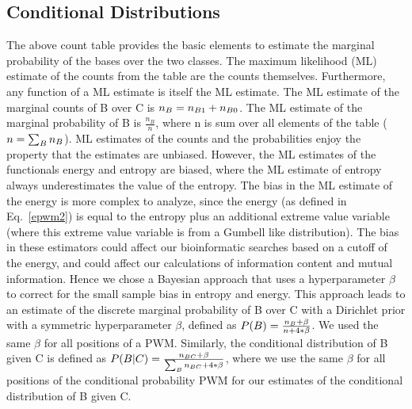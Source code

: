 \subsection{Conditional Distributions}\label{cdhyper}
The above count table provides the basic elements to estimate the marginal probability of the bases over the two classes.  The maximum likelihood (ML) estimate of the counts from the table are the counts themselves.  Furthermore, any function of a ML estimate is itself the ML estimate.  The ML estimate of the marginal counts of B over C is $n_{\scriptsize B}=n_{\scriptsize{B1}}+n_{
\scriptsize{B0}}$.  The ML estimate of the marginal probability of B is $\frac{n_B}{n}$, where n is sum over all elements of the table ($n=\sum_{\scriptsize B} n_{\scriptsize B}$).  ML estimates of the counts and the probabilities enjoy the property that the estimates are unbiased.  However, the ML estimates of the functionals energy and entropy are biased, where the ML estimate of entropy always underestimates the value of the entropy\cite{Nemenman02entropyand}. The bias in the ML estimate of the energy is more complex to analyze, since the energy (as defined in Eq.~\ref{epwm2}) is equal to the entropy plus an additional extreme value variable (where this extreme value variable is from a Gumbell like distribution).  The bias in these estimators could affect our bioinformatic searches based on a cutoff of the energy, and could affect our calculations of information content and mutual information.  Hence we chose a Bayesian approach that uses a hyperparameter $\beta$ to correct for the small sample bias in entropy and energy.  This approach leads to an estimate of the discrete marginal probability of B over C with a Dirichlet prior with a symmetric hyperparameter $\beta$, defined as $P(B)=\frac{n_{\scriptsize B}+\beta}{n+4*\beta}$.  We used the same $\beta$ for all positions of a PWM\cite{MEP}.  Similarly, the conditional distribution of B given C is defined  as $P(B|C)=\frac{n_{\scriptsize{BC}}+\beta}{\sum_{\scriptsize B} n_{\scriptsize{BC}}+4*\beta}$, where we use the same $\beta$ for all positions of the conditional probability PWM for our estimates of the conditional distribution of B given C. 

